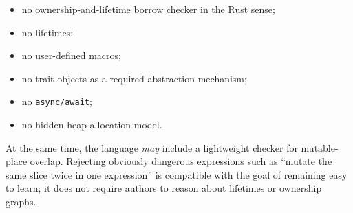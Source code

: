 \documentclass[12pt,oneside]{article}
\begin{document}
\begin{itemize}
\item no ownership-and-lifetime borrow checker in the Rust sense;
\item no lifetimes;
\item no user-defined macros;
\item no trait objects as a required abstraction mechanism;
\item no \verb|async/await|;
\item no hidden heap allocation model.
\end{itemize}

At the same time, the language \emph{may} include a lightweight checker for
mutable-place overlap. Rejecting obviously dangerous expressions such as
``mutate the same slice twice in one expression'' is compatible with the goal of
remaining easy to learn; it does not require authors to reason about lifetimes
or ownership graphs.
\end{document}
